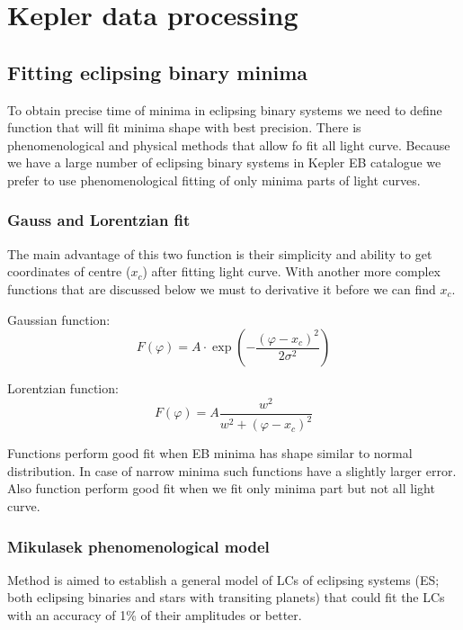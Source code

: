 \chapter{Kepler data processing}
\label{Chapter3}

\section{Fitting eclipsing binary minima}
To obtain precise time of minima in eclipsing binary systems we need to define function that will fit minima shape with best precision.
There is phenomenological and physical methods that allow fo fit all light curve. Because we have a large number of eclipsing binary systems in Kepler EB catalogue we prefer to use phenomenological fitting of only minima parts of light curves.

\subsection{Gauss and Lorentzian fit}
The main advantage of this two function is their simplicity and ability to get coordinates of centre ($x_{c}$) after fitting light curve.
With another more complex functions that are discussed below we must to derivative it before we can find $x_{c}$.

Gaussian function:
\begin{equation}\label{eq:gaus}
F(\varphi)= A\cdot \exp(-\frac{(\varphi - x_{c})^2}{2\sigma^2})
\end{equation}

Lorentzian function: 
\begin{equation}\label{eq:lorentz}
F(\varphi)= A \frac{w^2}{w^2 + (\varphi - x_{c})^2}
\end{equation}

Functions perform good fit when EB minima has shape similar to normal distribution. In case of narrow minima such functions have a slightly larger error. Also function perform good fit when we fit only minima part but not all light curve. 

\subsection{Mikulasek phenomenological model}
Method is aimed to establish a general model of LCs of eclipsing
systems (ES; both eclipsing binaries and stars with transiting
planets) that could fit the LCs with an accuracy of 1\% of their
amplitudes or better. 

